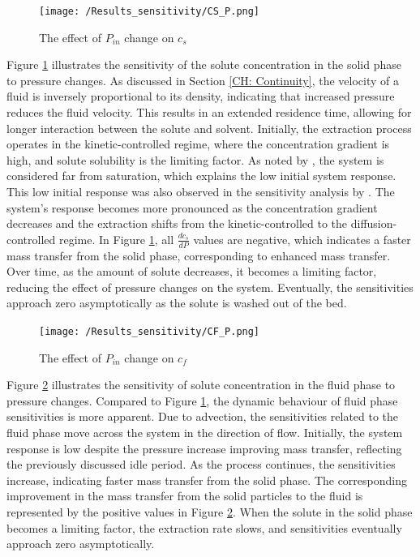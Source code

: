 \documentclass[a4paper,fleqn]{cas-dc}
\begin{document}
	\begin{figure}[!ht]
		\centering
		\texttt{[image: /Results\_sensitivity/CS\_P.png]}
		\caption{The effect of $P_{in}$ change on $c_s$}
		\label{fig:Sensitivty_P_CS}
	\end{figure}
	
	Figure \ref{fig:Sensitivty_P_CS} illustrates the sensitivity of the solute concentration in the solid phase to pressure changes. As discussed in Section \ref{CH: Continuity}, the velocity of a fluid is inversely proportional to its density, indicating that increased pressure reduces the fluid velocity. This results in an extended residence time, allowing for longer interaction between the solute and solvent. Initially, the extraction process operates in the kinetic-controlled regime, where the concentration gradient is high, and solute solubility is the limiting factor. As noted by \citet{Sliczniuk2024}, the system is considered far from saturation, which explains the low initial system response. This low initial response was also observed in the sensitivity analysis by \citet{Fiori_2007}. The system's response becomes more pronounced as the concentration gradient decreases and the extraction shifts from the kinetic-controlled to the diffusion-controlled regime. In Figure \ref{fig:Sensitivty_P_CS}, all $\frac{dc_s}{dP}$ values are negative, which indicates a faster mass transfer from the solid phase, corresponding to enhanced mass transfer.  Over time, as the amount of solute decreases, it becomes a limiting factor, reducing the effect of pressure changes on the system. Eventually, the sensitivities approach zero asymptotically as the solute is washed out of the bed.
	
	\begin{figure}[!ht]
		\centering
		\texttt{[image: /Results\_sensitivity/CF\_P.png]}
		\caption{The effect of $P_{in}$ change on $c_f$}
		\label{fig:Sensitivty_P_CF}
	\end{figure}
	
	
	Figure \ref{fig:Sensitivty_P_CF} illustrates the sensitivity of solute concentration in the fluid phase to pressure changes. Compared to Figure \ref{fig:Sensitivty_P_CS}, the dynamic behaviour of fluid phase sensitivities is more apparent. Due to advection, the sensitivities related to the fluid phase move across the system in the direction of flow. Initially, the system response is low despite the pressure increase improving mass transfer, reflecting the previously discussed idle period. As the process continues, the sensitivities increase, indicating faster mass transfer from the solid phase. The corresponding improvement in the mass transfer from the solid particles to the fluid is represented by the positive values in Figure \ref{fig:Sensitivty_P_CF}. When the solute in the solid phase becomes a limiting factor, the extraction rate slows, and sensitivities eventually approach zero asymptotically.
	
\end{document}
